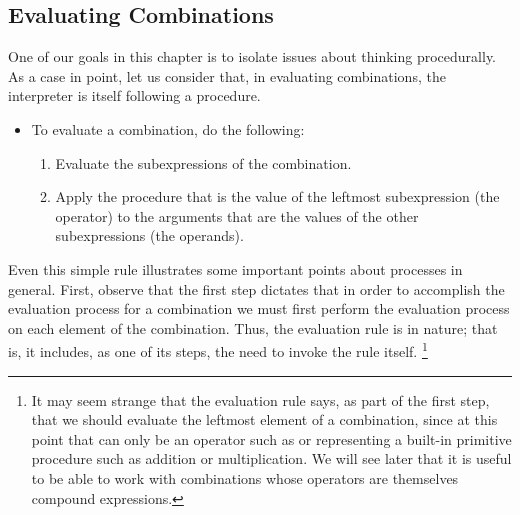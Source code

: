 \subsection{Evaluating Combinations}
\label{Section 1.1.3}

One of our goals in this chapter is to isolate issues about thinking procedurally.
As a case in point, let us consider that, in evaluating combinations, the interpreter is itself following a procedure.
\begin{itemize}

	\item
		To evaluate a combination, do the following:
		\begin{enumerate}[leftmargin = *]

			\item
				Evaluate the subexpressions of the combination.

			\item
				Apply the procedure that is the value of the leftmost subexpression (the operator) to the arguments that are the values of the other subexpressions (the operands).

		\end{enumerate}
\end{itemize}
Even this simple rule illustrates some important points about processes in general.
First, observe that the first step dictates that in order to accomplish the evaluation process for a combination we must first perform the evaluation process on each element of the combination.
Thus, the evaluation rule is  in nature;
that is, it includes, as one of its steps, the need to invoke the rule itself.%
\footnote{
	It may seem strange that the evaluation rule says, as part of the first step, that we should evaluate the leftmost element of a combination, since at this point that can only be an operator such as \code{+} or \code{*} representing a built-in primitive procedure such as addition or multiplication.
	We will see later that it is useful to be able to work with combinations whose operators are themselves compound expressions.
}

